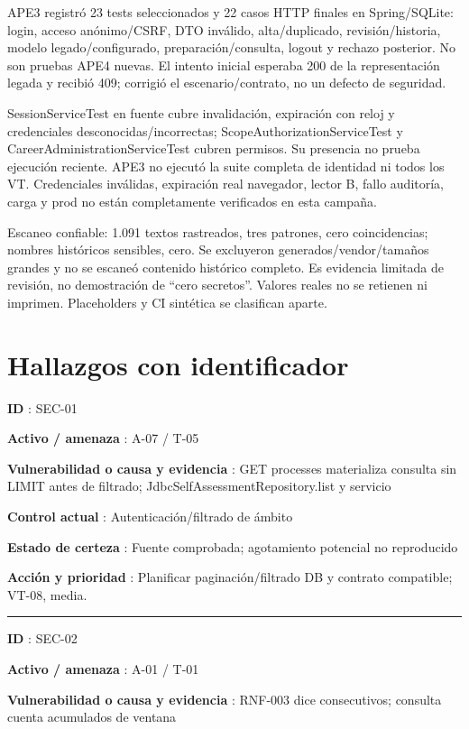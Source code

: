 \documentclass[12pt,a4paper]{report}
\begin{document}
APE3 registró 23 tests seleccionados y 22 casos HTTP finales en
Spring/SQLite: login, acceso anónimo/CSRF, DTO inválido, alta/duplicado,
revisión/historia, modelo legado/configurado, preparación/consulta,
logout y rechazo posterior. No son pruebas APE4 nuevas. El intento
inicial esperaba 200 de la representación legada y recibió 409; corrigió
el escenario/contrato, no un defecto de seguridad.

SessionServiceTest en fuente cubre invalidación, expiración con reloj y
credenciales desconocidas/incorrectas; ScopeAuthorizationServiceTest y
CareerAdministrationServiceTest cubren permisos. Su presencia no prueba
ejecución reciente. APE3 no ejecutó la suite completa de identidad ni
todos los VT. Credenciales inválidas, expiración real navegador, lector
B, fallo auditoría, carga y prod no están completamente verificados en
esta campaña.

Escaneo confiable: 1.091 textos rastreados, tres patrones, cero
coincidencias; nombres históricos sensibles, cero. Se excluyeron
generados/vendor/tamaños grandes y no se escaneó contenido histórico
completo. Es evidencia limitada de revisión, no demostración de ``cero
secretos''. Valores reales no se retienen ni imprimen. Placeholders y CI
sintética se clasifican aparte.

\section{Hallazgos con
identificador}\label{AA4-semana-4-hallazgos-con-identificador}

\textbf{ID }: SEC-01

\textbf{Activo / amenaza }: A-07 / T-05

\textbf{Vulnerabilidad o causa y evidencia }: GET processes materializa
consulta sin LIMIT antes de filtrado; JdbcSelfAssessmentRepository.list
y servicio

\textbf{Control actual }: Autenticación/filtrado de ámbito

\textbf{Estado de certeza }: Fuente comprobada; agotamiento potencial no
reproducido

\textbf{Acción y prioridad }: Planificar paginación/filtrado DB y
contrato compatible; VT-08, media.

\medskip\hrule\medskip

\textbf{ID }: SEC-02

\textbf{Activo / amenaza }: A-01 / T-01

\textbf{Vulnerabilidad o causa y evidencia }: RNF-003 dice consecutivos;
consulta cuenta acumulados de ventana
\end{document}
